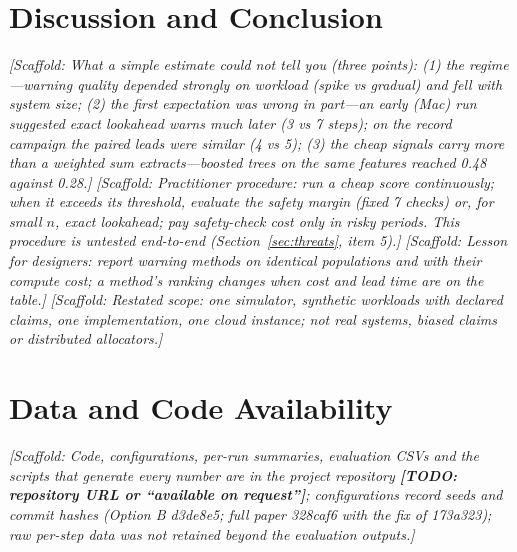 \documentclass[conference]{IEEEtran}
\newcommand{\scaffold}[1]{\textcolor{blue!60!black}{\textit{[Scaffold: #1]}}}
\newcommand{\todo}[1]{\textcolor{red!70!black}{\textbf{[TODO: #1]}}}
\begin{document}
\section{Discussion and Conclusion}\label{sec:conclusion}
\scaffold{What a simple estimate could not tell you (three points): (1) the regime---warning quality depended strongly on workload (spike vs gradual) and fell with system size; (2) the first expectation was wrong in part---an early (Mac) run suggested exact lookahead warns much later (3 vs 7 steps); on the record campaign the paired leads were similar (4 vs 5); (3) the cheap signals carry more than a weighted sum extracts---boosted trees on the same features reached 0.48 against 0.28.}
\scaffold{Practitioner procedure: run a cheap score continuously; when it exceeds its threshold, evaluate the safety margin (fixed 7 checks) or, for small $n$, exact lookahead; pay safety-check cost only in risky periods. This procedure is untested end-to-end (Section~\ref{sec:threats}, item 5).}
\scaffold{Lesson for designers: report warning methods on identical populations and with their compute cost; a method's ranking changes when cost and lead time are on the table.}
\scaffold{Restated scope: one simulator, synthetic workloads with declared claims, one implementation, one cloud instance; not real systems, biased claims or distributed allocators.}

\section*{Data and Code Availability}
\scaffold{Code, configurations, per-run summaries, evaluation CSVs and the scripts that generate every number are in the project repository \todo{repository URL or ``available on request''}; configurations record seeds and commit hashes (Option B d3de8e5; full paper 328caf6 with the fix of 173a323); raw per-step data was not retained beyond the evaluation outputs.}



\nocite{*}
\end{document}
